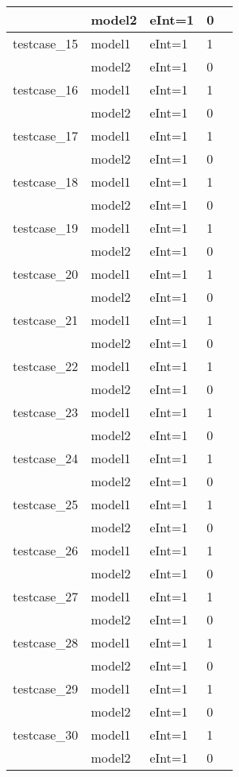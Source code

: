 \documentclass[a4paper]{article}
\begin{document}
\begin{longtable}{|l|l|l|l|l|}
\hline
 & model2 & eInt=1 & 0 &\\
\hline
testcase\_15 & model1 & eInt=1 & 1 &\\
\hline
 & model2 & eInt=1 & 0 &\\
\hline
testcase\_16 & model1 & eInt=1 & 1 &\\
\hline
 & model2 & eInt=1 & 0 &\\
\hline
testcase\_17 & model1 & eInt=1 & 1 &\\
\hline
 & model2 & eInt=1 & 0 &\\
\hline
testcase\_18 & model1 & eInt=1 & 1 &\\
\hline
 & model2 & eInt=1 & 0 &\\
\hline
testcase\_19 & model1 & eInt=1 & 1 &\\
\hline
 & model2 & eInt=1 & 0 &\\
\hline
testcase\_20 & model1 & eInt=1 & 1 &\\
\hline
 & model2 & eInt=1 & 0 &\\
\hline
testcase\_21 & model1 & eInt=1 & 1 &\\
\hline
 & model2 & eInt=1 & 0 &\\
\hline
testcase\_22 & model1 & eInt=1 & 1 &\\
\hline
 & model2 & eInt=1 & 0 &\\
\hline
testcase\_23 & model1 & eInt=1 & 1 &\\
\hline
 & model2 & eInt=1 & 0 &\\
\hline
testcase\_24 & model1 & eInt=1 & 1 &\\
\hline
 & model2 & eInt=1 & 0 &\\
\hline
testcase\_25 & model1 & eInt=1 & 1 &\\
\hline
 & model2 & eInt=1 & 0 &\\
\hline
testcase\_26 & model1 & eInt=1 & 1 &\\
\hline
 & model2 & eInt=1 & 0 &\\
\hline
testcase\_27 & model1 & eInt=1 & 1 &\\
\hline
 & model2 & eInt=1 & 0 &\\
\hline
testcase\_28 & model1 & eInt=1 & 1 &\\
\hline
 & model2 & eInt=1 & 0 &\\
\hline
testcase\_29 & model1 & eInt=1 & 1 &\\
\hline
 & model2 & eInt=1 & 0 &\\
\hline
testcase\_30 & model1 & eInt=1 & 1 &\\
\hline
 & model2 & eInt=1 & 0 &\\

\end{longtable}
\end{document}
